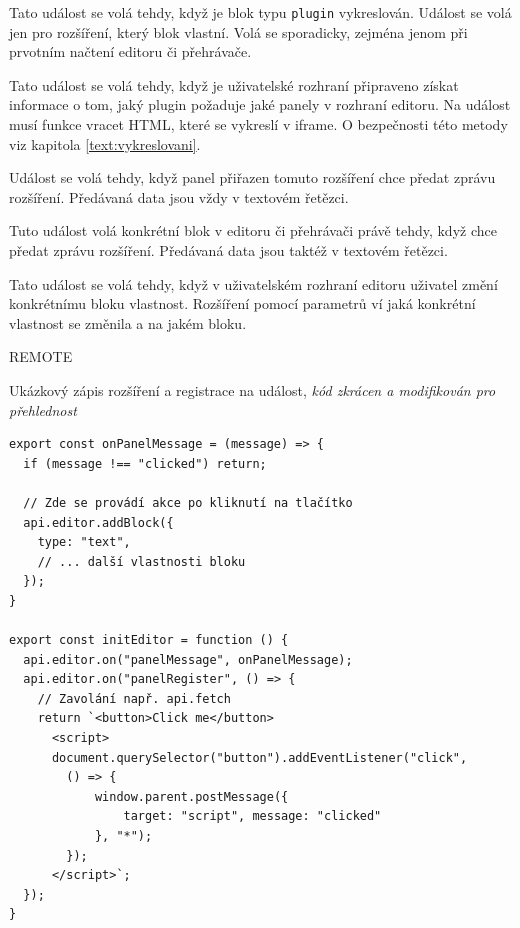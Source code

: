 \begin{description}
    \item[pluginBlockRender] Tato událost se volá tehdy, když je blok typu \texttt{plugin} vykreslován. Událost se volá jen pro rozšíření, který blok vlastní. Volá se sporadicky, zejména jenom při prvotním načtení editoru či přehrávače. 
    \item[panelRegister] Tato událost se volá tehdy, když je uživatelské rozhraní připraveno získat informace o tom, jaký plugin požaduje jaké panely v rozhraní editoru. Na událost musí funkce vracet HTML, které se vykreslí v iframe. O bezpečnosti této metody viz kapitola \ref{text:vykreslovani}.
    \item[panelMessage] Událost se volá tehdy, když panel přiřazen tomuto rozšíření chce předat zprávu rozšíření. Předávaná data jsou vždy v textovém řetězci.
    \item[pluginBlockMessage] Tuto událost volá konkrétní blok v editoru či přehrávači právě tehdy, když chce předat zprávu rozšíření. Předávaná data jsou taktéž v textovém řetězci.
    \item[pluginBlockPropertyChange] Tato událost se volá tehdy, když v uživatelském rozhraní editoru uživatel změní konkrétnímu bloku vlastnost. Rozšíření pomocí parametrů ví jaká konkrétní vlastnost se změnila a na jakém bloku.
    \item REMOTE
\end{description}

\begin{listing}[ht!]
\caption[Ukázkový zápis rozšíření a registrace na událost]{Ukázkový zápis rozšíření a registrace na událost, \textit{kód zkrácen a modifikován pro přehlednost}}\label{code:registraceUdalosti}
\begin{verbatim}
export const onPanelMessage = (message) => {
  if (message !== "clicked") return;

  // Zde se provádí akce po kliknutí na tlačítko
  api.editor.addBlock({
    type: "text",
    // ... další vlastnosti bloku
  });
}

export const initEditor = function () {
  api.editor.on("panelMessage", onPanelMessage);
  api.editor.on("panelRegister", () => {
    // Zavolání např. api.fetch
    return `<button>Click me</button>
      <script>
      document.querySelector("button").addEventListener("click", 
        () => {
            window.parent.postMessage({
                target: "script", message: "clicked"
            }, "*");
        });
      </script>`;
  });
}
\end{verbatim}
\end{listing}


